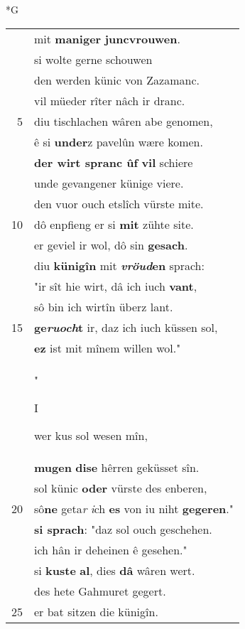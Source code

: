 \documentclass[8pt,a4paper,notitlepage]{article}
\begin{document}
\newpage
\begin{table}[ht]
\begin{minipage}[t]{0.5\linewidth}
\small
\begin{center}*G
\end{center}
\begin{tabular}{rl}
 & mit \textbf{maniger} \textbf{juncvrouwen}.\\ 
 & si wolte gerne schouwen\\ 
 & den werden künic von Zazamanc.\\ 
 & vil müeder rîter nâch ir dranc.\\ 
5 & diu tischlachen wâren abe genomen,\\ 
 & ê si \textbf{under}z pavelûn wære komen.\\ 
 & \textbf{der wirt spranc ûf} \textbf{vil} schiere\\ 
 & unde gevangener künige viere.\\ 
 & den vuor ouch etslîch vürste mite.\\ 
10 & dô enpfieng er si \textbf{mit} zühte site.\\ 
 & er geviel ir wol, dô sin \textbf{gesach}.\\ 
 & diu \textbf{künigîn} mit \textbf{\textit{vröud}en} sprach:\\ 
 & "ir sît hie wirt, dâ ich iuch \textbf{vant},\\ 
 & sô bin ich wirtîn überz lant.\\ 
15 & \textbf{ge\textit{ruoch}t} ir, daz ich iuch küssen sol,\\ 
 & \textbf{ez} ist mit mînem willen wol."\\ 
 & "\begin{large}I\end{large}wer kus sol wesen mîn,\\ 
 & \textbf{mugen} \textbf{dise} hêrren geküsset sîn.\\ 
 & sol künic \textbf{oder} vürste des enberen,\\ 
20 & sô\textbf{ne} geta\textit{r} \textit{i}ch \textbf{es} von iu niht \textbf{gegeren}."\\ 
 & \textbf{si sprach}: "daz sol ouch geschehen.\\ 
 & ich hân ir deheinen ê gesehen."\\ 
 & si \textbf{kuste} \textbf{al}, dies \textbf{dâ} wâren wert.\\ 
 & des hete Gahmuret gegert.\\ 
25 & er bat sitzen die künigîn.\\ 

\end{tabular}
\end{minipage}
\end{table}
\end{document}
